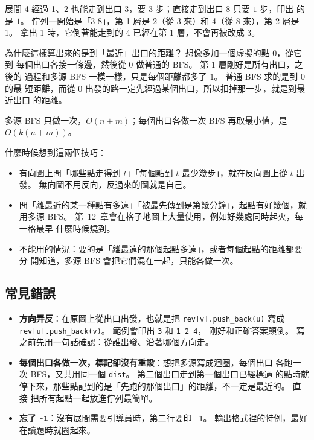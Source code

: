 展間 4 經過 1、2 也能走到出口 3，要 $3$ 步；直接走到出口 8 只要 $1$ 步，印出
的是 $1$。 佇列一開始是「3 8」，第 1 層是 2（從 3 來）和 4（從 8 來），第 2
層是 1。 拿出 1 時，它倒著能走到的 4 已經在第 1 層，不會再被改成 $3$。

為什麼這樣算出來的是到「最近」出口的距離？ 想像多加一個虛擬的點 $0$，從它到
每個出口各接一條邊，然後從 $0$ 做普通的 BFS。 第 1 層剛好是所有出口，之後的
過程和多源 BFS 一模一樣，只是每個距離都多了 $1$。 普通 BFS 求的是到 $0$ 的最
短距離，而從 $0$ 出發的路一定先經過某個出口，所以扣掉那一步，就是到最近出口
的距離。

多源 BFS 只做一次，$O(n + m)$；每個出口各做一次 BFS 再取最小值，是
$O(k(n + m))$。

什麼時候想到這兩個技巧：

\begin{itemize}
\item 有向圖上問「哪些點走得到 $t$」「每個點到 $t$ 最少幾步」，就在反向圖上從
$t$ 出發。 無向圖不用反向，反過來的圖就是自己。
\item 問「離最近的某一種點有多遠」「被最先傳到是第幾分鐘」，起點有好幾個，就
用多源 BFS。 第~12~章會在格子地圖上大量使用，例如好幾處同時起火，每一格最早
什麼時候燒到。
\item 不能用的情況：要的是「離最遠的那個起點多遠」，或者每個起點的距離都要分
開知道，多源 BFS 會把它們混在一起，只能各做一次。
\end{itemize}

\subsection{常見錯誤}

\begin{itemize}
\item \textbf{方向弄反}：在原圖上從出口出發，也就是把 \texttt{rev[v].push\_back(u)}
寫成 \texttt{rev[u].push\_back(v)}。 範例會印出 \texttt{3} 和 \texttt{1 2 4}，
剛好和正確答案顛倒。 寫之前先用一句話確認：從誰出發、沿著哪個方向走。
\item \textbf{每個出口各做一次，標記卻沒有重設}：想把多源寫成迴圈，每個出口
各跑一次 BFS，又共用同一個 \texttt{dist}。 第二個出口走到第一個出口已經標過
的點時就停下來，那些點記到的是「先跑的那個出口」的距離，不一定是最近的。 直接
把所有起點一起放進佇列最簡單。
\item \textbf{忘了 \texttt{-1}}：沒有展間需要引導員時，第二行要印
\texttt{-1}。 輸出格式裡的特例，最好在讀題時就圈起來。
\end{itemize}

